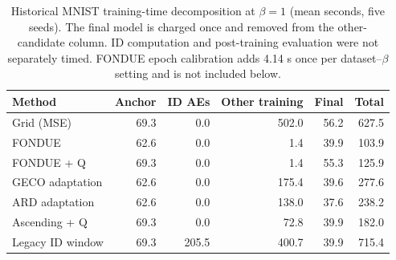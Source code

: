 \documentclass[make,article,submit,pdftex,moreauthors]{Definitions/mdpi}
\begin{document}
\begin{table}[H]
\caption{Historical MNIST training-time decomposition at $\beta=1$ (mean seconds, five seeds). The final model is charged once and removed from the other-candidate column. ID computation and post-training evaluation were not separately timed. FONDUE epoch calibration adds 4.14 s once per dataset--$\beta$ setting and is not included below.}\label{tab:cost}
\footnotesize
\setlength{\tabcolsep}{3.5pt}
\begin{tabular*}{\textwidth}{@{\extracolsep{\fill}}lrrrrr@{}}
\toprule
Method & Anchor & ID AEs & Other training & Final & Total \\
\midrule
Grid (MSE) & 69.3 & 0.0 & 502.0 & 56.2 & 627.5 \\
FONDUE & 62.6 & 0.0 & 1.4 & 39.9 & 103.9 \\
FONDUE + Q & 69.3 & 0.0 & 1.4 & 55.3 & 125.9 \\
GECO adaptation & 62.6 & 0.0 & 175.4 & 39.6 & 277.6 \\
ARD adaptation & 62.6 & 0.0 & 138.0 & 37.6 & 238.2 \\
Ascending + Q & 69.3 & 0.0 & 72.8 & 39.9 & 182.0 \\
Legacy ID window & 69.3 & 205.5 & 400.7 & 39.9 & 715.4 \\
\bottomrule
\end{tabular*}
\end{table}
\end{document}
